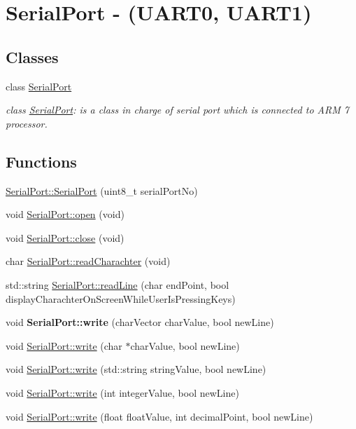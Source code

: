 \hypertarget{group__group8}{
\section{SerialPort -\/ (UART0, UART1)}
\label{group__group8}
}
\subsection*{Classes}
\begin{DoxyCompactItemize}
\item 
class \hyperlink{class_serial_port}{SerialPort}
\begin{DoxyCompactList}\small\item\em class \hyperlink{class_serial_port}{SerialPort}: is a class in charge of serial port which is connected to ARM 7 processor. \end{DoxyCompactList}\end{DoxyCompactItemize}
\subsection*{Functions}
\begin{DoxyCompactItemize}
\item 
\hyperlink{group__group8_ga519a9b40483d14c104f71ca4880cc1a1}{SerialPort::SerialPort} (uint8\_\-t serialPortNo)
\item 
void \hyperlink{group__group8_ga6d80380bb3415a1ee4355ffcec98773c}{SerialPort::open} (void)
\item 
void \hyperlink{group__group8_gaabba6d6f25800b197cee28ed8e605f2a}{SerialPort::close} (void)
\item 
char \hyperlink{group__group8_gaec0ee477ce1fbd16ce862abd9116e2ad}{SerialPort::readCharachter} (void)
\item 
std::string \hyperlink{group__group8_ga46bc7a8f70d57e8f59729432b0c81d3e}{SerialPort::readLine} (char endPoint, bool displayCharachterOnScreenWhileUserIsPressingKeys)
\item 
\hypertarget{group__group8_gafed1850129619b1d56beb8ea008599de}{
void {\bfseries SerialPort::write} (charVector charValue, bool newLine)}
\label{group__group8_gafed1850129619b1d56beb8ea008599de}

\item 
void \hyperlink{group__group8_gae48d12719fd7e1e2b0e35f127a5006bf}{SerialPort::write} (char $\ast$charValue, bool newLine)
\item 
void \hyperlink{group__group8_ga93f70c8ee96c97eee2d31df578bdf51e}{SerialPort::write} (std::string stringValue, bool newLine)
\item 
void \hyperlink{group__group8_gad981db5bddd0681367480c272c87fb38}{SerialPort::write} (int integerValue, bool newLine)
\item 
void \hyperlink{group__group8_gab50edcebab73bfe52b729f677dd61636}{SerialPort::write} (float floatValue, int decimalPoint, bool newLine)
\end{DoxyCompactItemize}


